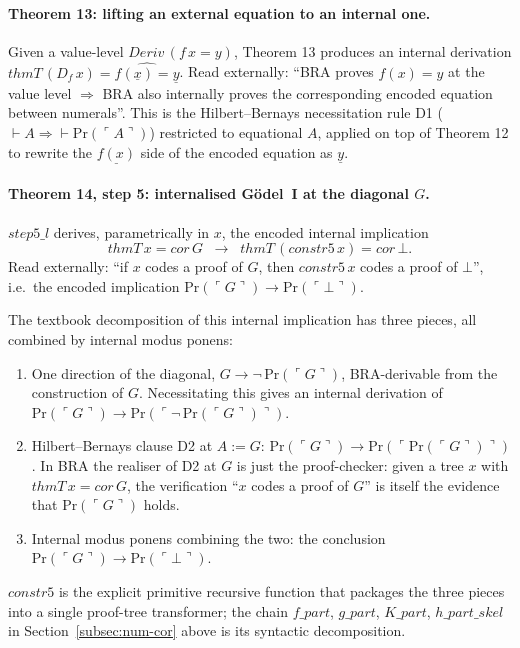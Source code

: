 \documentclass[11pt]{article}
\begin{document}
\paragraph{Theorem 13: lifting an external equation to an internal one.}
Given a value-level $\mathit{Deriv}\,(f\,x = y)$, Theorem 13 produces
an internal derivation
$\mathit{thmT}\,(D_f\,x) = \widehat{f(\underline{x}) = \underline{y}}$.
Read externally: ``BRA proves $f(x) = y$ at the value level $\Rightarrow$
BRA also internally proves the corresponding encoded equation between
numerals''.  This is the Hilbert--Bernays necessitation rule D1
($\vdash A \Rightarrow \vdash \mathrm{Pr}(\ulcorner A \urcorner)$)
restricted to equational $A$, applied on top of Theorem 12 to rewrite
the $\underline{f(x)}$ side of the encoded equation as $\underline{y}$.

\paragraph{Theorem 14, step 5: internalised G\"odel~I at the diagonal $G$.}
$\mathit{step5\_l}$ derives, parametrically in $x$, the encoded internal
implication
\[
  \mathit{thmT}\,x = \mathit{cor}\,G \;\;\to\;\;
  \mathit{thmT}\,(\mathit{constr5}\,x) = \mathit{cor}\,\bot.
\]
Read externally: ``if $x$ codes a proof of $G$, then
$\mathit{constr5}\,x$ codes a proof of $\bot$'', i.e.\ the encoded
implication $\mathrm{Pr}(\ulcorner G\urcorner) \to
\mathrm{Pr}(\ulcorner \bot\urcorner)$.

The textbook decomposition of this internal implication has three
pieces, all combined by internal modus ponens:
\begin{enumerate}
  \item One direction of the diagonal,
        $G \to \neg\,\mathrm{Pr}(\ulcorner G\urcorner)$, BRA-derivable
        from the construction of $G$.  Necessitating this gives an
        internal derivation of
        $\mathrm{Pr}(\ulcorner G\urcorner) \to
         \mathrm{Pr}(\ulcorner \neg\,\mathrm{Pr}(\ulcorner G\urcorner)\urcorner)$.
  \item Hilbert--Bernays clause D2 at $A := G$:
        $\mathrm{Pr}(\ulcorner G\urcorner) \to
         \mathrm{Pr}(\ulcorner \mathrm{Pr}(\ulcorner G\urcorner)\urcorner)$.
        In BRA the realiser of D2 at $G$ is just the proof-checker:
        given a tree $x$ with $\mathit{thmT}\,x = \mathit{cor}\,G$,
        the verification ``$x$ codes a proof of $G$'' is itself the
        evidence that $\mathrm{Pr}(\ulcorner G\urcorner)$ holds.
  \item Internal modus ponens combining the two: the conclusion
        $\mathrm{Pr}(\ulcorner G\urcorner) \to \mathrm{Pr}(\ulcorner
        \bot\urcorner)$.
\end{enumerate}
$\mathit{constr5}$ is the explicit primitive recursive function that
packages the three pieces into a single proof-tree transformer; the
chain $f\_\mathit{part}$, $g\_\mathit{part}$, $K\_\mathit{part}$,
$h\_\mathit{part}\_\mathit{skel}$ in Section~\ref{subsec:num-cor} above
is its syntactic decomposition.
\end{document}
